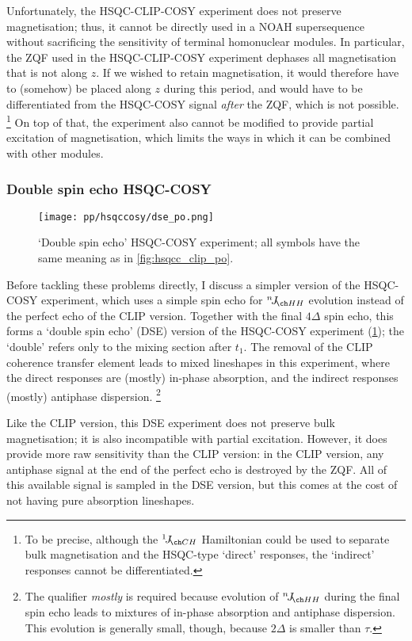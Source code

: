 Unfortunately, the HSQC-CLIP-COSY experiment does not preserve  magnetisation; thus, it cannot be directly used in a NOAH supersequence without sacrificing the sensitivity of terminal homonuclear modules.
In particular, the ZQF used in the HSQC-CLIP-COSY experiment dephases all magnetisation that is not along $z$.
If we wished to retain  magnetisation, it would therefore have to (somehow) be placed along $z$ during this period, and would have to be differentiated from the HSQC-COSY signal \textit{after} the ZQF, which is not possible.%
\footnote{To be precise, although the $\oneJ{CH}$ Hamiltonian could be used to separate bulk magnetisation and the HSQC-type `direct' responses, the `indirect' responses cannot be differentiated.}
On top of that, the experiment also cannot be modified to provide partial excitation of  magnetisation, which limits the ways in which it can be combined with other \carbon{} modules.


\subsubsection{Double spin echo HSQC-COSY}

\begin{figure}[!ht]
    \centering
    \texttt{[image: pp/hsqccosy/dse\_po.png]}%
    \caption[Double spin echo HSQC-COSY experiment]{
        `Double spin echo' HSQC-COSY experiment; all symbols have the same meaning as in \cref{fig:hsqcc_clip_po}.
    }
    \label{fig:hsqcc_dse_po}
\end{figure}

Before tackling these problems directly, I discuss a simpler version of the HSQC-COSY experiment, which uses a simple spin echo for $\nJ{HH}$ evolution instead of the perfect echo of the CLIP version.
Together with the final $4\Delta$ spin echo, this forms a `double spin echo' (DSE) version of the HSQC-COSY experiment (\cref{fig:hsqcc_dse_po}); the `double' refers only to the mixing section after $t_1$.
The removal of the CLIP coherence transfer element leads to mixed lineshapes in this experiment, where the direct responses are (mostly) in-phase absorption, and the indirect responses (mostly) antiphase dispersion.%
\footnote{The qualifier \textit{mostly} is required because evolution of $\nJ{HH}$ during the final spin echo leads to mixtures of in-phase absorption and antiphase dispersion. This evolution is generally small, though, because $2\Delta$ is smaller than $\tau$.}

Like the CLIP version, this DSE experiment does not preserve bulk magnetisation; it is also incompatible with partial  excitation.
However, it does provide more raw sensitivity than the CLIP version: in the CLIP version, any antiphase signal at the end of the perfect echo is destroyed by the ZQF.
All of this available signal is sampled in the DSE version, but this comes at the cost of not having pure absorption lineshapes.

